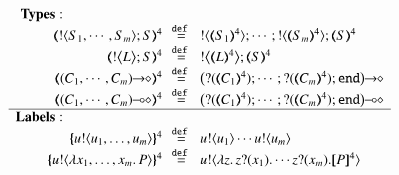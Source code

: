 \begin{figure}[t]
\small
\[
\begin{array}{rcl}
{\bf Types:}\hspace{2.5cm}\\
		\tmap{\btout{S_1, \cdots, S_m}S}{4}
		&\!\!\defeq\!\!&
		\btout{\tmap{S_1}{4}} \cdots ; \btout{\tmap{S_m}{4}}\tmap{S}{4}
		\\
		\tmap{\bbtout{L} S}{4}
		&\!\!\defeq\!\!&
		\bbtout{\mapt{L}^{4}}\mapt{S}^{4}
		\\
		\tmap{\shot{(C_1, \cdots, C_m)}}{4}
		&\!\!\defeq\!\!&
		\shot{\big(\btinp{\tmap{C_1}{4}} \cdots; \btinp{\tmap{C_m}{4}}\tinact\big)}
		\\
		\tmap{\lhot{(C_1, \cdots, C_m)}}{4}
		&\!\!\defeq\!\!&
		\lhot{\big(\btinp{\tmap{C_1}{4}} \cdots; \btinp{\tmap{C_m}{4}}\tinact\big)}
		\\
\hline
{\bf Labels:}\hspace{2.5cm}\\
		\mapa{\bactout{u}{u_1, \ldots, u_m}}^4 
		&\!\!\!\!\defeq\!\!\!\!&
 \bactout{u}{u_1} \cdots \bactout{u}{u_m} \\
		\mapa{\bactout{u}{\abs{x_1, \ldots, x_m}{P}} }^4 
		&\!\!\defeq\!\!&
\bactout{u}{\abs{z}\binp{z}{x_1} \cdots \binp{z}{x_m} \map{P}^{4}}\\

\end{array}\]
\end{figure}
